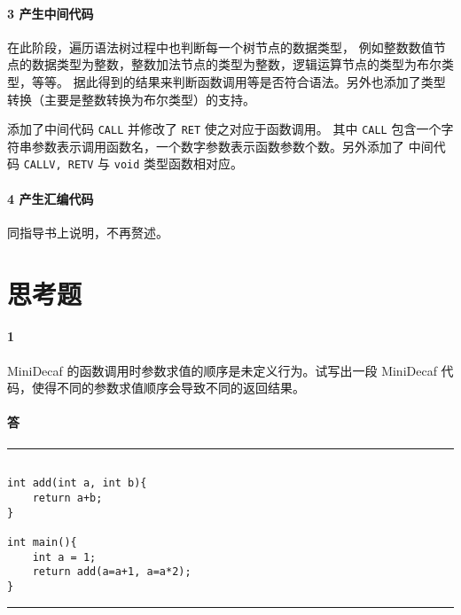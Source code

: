 \documentclass[UTF8]{ctexart}
\newcommand{\T}[1]{\texttt{{#1}}}
\begin{document}
            \paragraph{3 产生中间代码} 在此阶段，遍历语法树过程中也判断每一个树节点的数据类型，
            例如整数数值节点的数据类型为整数，整数加法节点的类型为整数，逻辑运算节点的类型为布尔类型，等等。
            据此得到的结果来判断函数调用等是否符合语法。另外也添加了类型转换（主要是整数转换为布尔类型）的支持。
            
            添加了中间代码 \T{CALL} 并修改了 \T{RET} 使之对应于函数调用。
            其中 \T{CALL} 包含一个字符串参数表示调用函数名，一个数字参数表示函数参数个数。另外添加了
            中间代码 \T{CALLV, RETV} 与 \T{void} 类型函数相对应。

            \paragraph{4 产生汇编代码} 同指导书上说明，不再赘述。
        
    \section{思考题}
        \paragraph{1} MiniDecaf 的函数调用时参数求值的顺序是未定义行为。试写出一段 MiniDecaf 代码，使得不同的参数求值顺序会导致不同的返回结果。
        \paragraph{答} 

        \noindent\rule{\textwidth}{1pt}
        \begin{lstlisting}[style=lfonts]

int add(int a, int b){
    return a+b;
}

int main(){
    int a = 1;
    return add(a=a+1, a=a*2);
}

        \end{lstlisting}
        \noindent\rule{\textwidth}{1pt}
\end{document}
